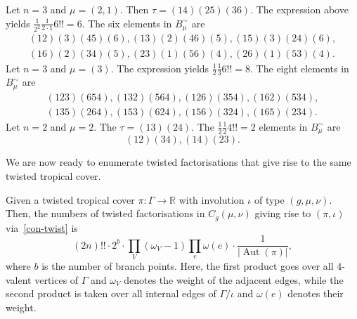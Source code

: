 \documentclass[ALCO,published]{cedram}
\DeclareMathOperator{\Aut}{Aut}
\begin{document}
\begin{exam}
Let $n=3$ and $\mu=(2,1)$. Then $\tau=(14)(25)(36)$.
The expression above yields $\frac{1}{2^2}\frac{1}{2\cdot 1}6!! = 6$.
The six elements in $B^{\sim}_\mu$ are
\begin{gather*}
    (12)(3)(45)(6), (13)(2)(46)(5), (15)(3)(24)(6), \\
    (16)(2)(34)(5), (23)(1)(56)(4), (26)(1)(53)(4).
\end{gather*}
\noindent
Let $n=3$ and $\mu=(3)$. The expression yields $\frac{1}{2}\frac{1}{3}6!!= 8$.
The eight elements in $B^{\sim}_\mu$ are
\begin{gather*}
    (123)(654), (132)(564), (126)(354), (162)(534), \\ 
    (135)(264), (153)(624), (156)(324), (165)(234).
\end{gather*}
\noindent
Let $n=2$ and $\mu=2$. The $\tau=(13)(24)$. The $\frac{1}{2}\frac{1}{2}4!!=2$ elements in $B^{\sim}_\mu$ are
$$ (12)(34), (14)(23).$$
\end{exam}

We are now ready to enumerate twisted factorisations that give rise to the same twisted tropical cover.

\begin{prop}\label{thm-covermult}
Given a twisted tropical cover $\pi\colon\Gamma\to\mathbb{R}$ with involution $\iota$ of type $(g,\mu,\nu)$. Then, the numbers of twisted factorisations in $C_g(\mu,\nu)$ giving rise to $(\pi,\iota)$ via~\cref{con-twist} is
\begin{equation*}
(2n)!!\cdot 2^{b}\cdot \prod_V (\omega_V-1)\prod_e\omega(e)\cdot \frac{1}{|\Aut(\pi)|},
\end{equation*}
where $b$ is the number of branch points. Here, the first product goes over all $4$-valent vertices of $\Gamma$ and $\omega_V$ denotes the weight of the adjacent edges, while the second product is taken over all internal edges of $\Gamma/\iota$ and $\omega(e)$ denotes their weight.
\end{prop}
\end{document}
